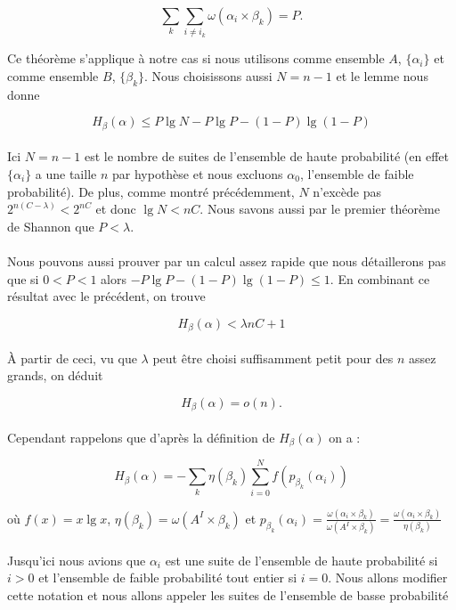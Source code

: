 	\[\sum_k\sum_{i\neq i_k}\omega(\alpha_i \times \beta_k) = P.\]	
	
	Ce théorème s'applique à notre cas si nous utilisons comme ensemble $A$,
	$\{\alpha_i\}$ et comme ensemble $B$, $\{\beta_k\}$. Nous choisissons
	aussi $N = n-1$ et le lemme nous donne
	
	\[H_\beta(\alpha)\le P\lg N - P\lg P - (1-P)\lg(1-P)\]
	
	\paragraph{}
	Ici $N = n-1$ est le nombre de suites de l'ensemble de haute probabilité 
	(en effet $\{\alpha_i\}$ a une taille $n$ par hypothèse et nous excluons
	$\alpha_0$, l'ensemble de faible probabilité). De plus, comme montré 
	précédemment, $N$ n'excède pas $2^{n(C-\lambda)}<2^{nC}$ et donc 
	$\lg N<nC$. Nous savons aussi par le premier théorème de Shannon 
	que $P<\lambda$.
	
	\paragraph{}
	Nous pouvons aussi prouver par un calcul assez rapide que nous détaillerons 
	pas que si $0<P<1$ alors $-P\lg P -(1-P)\lg(1-P)\le 1$. En combinant ce 
	résultat avec le précédent,	on trouve
	
	\[H_\beta(\alpha) < \lambda nC + 1\]
	
	\paragraph{}
	À partir de ceci, vu que $\lambda$ peut être choisi suffisamment petit pour
	 des $n$ assez grands, on déduit 
	
	\[H_\beta(\alpha)=o(n).\]
	
	\paragraph{}
	Cependant rappelons que d'après la définition de $H_\beta(\alpha)$ on a :
	
	\[
		H_\beta(\alpha) = 
		- \sum_k\eta(\beta_k)\sum_{i=0}^Nf(p_{\beta_k}(\alpha_i))
	\]
	
	où $f(x) = x \lg x$, $\eta(\beta_k) = \omega(A^I \times \beta_k)$ 
	et 
		$p_{\beta_k}(\alpha_i) = 
		\frac{\omega(\alpha_i \times \beta_k)}{\omega(A^I \times \beta_k)}=
		\frac{\omega(\alpha_i \times \beta_k)}{\eta(\beta_k)}$	
	
	\paragraph{}
	Jusqu'ici nous avions que $\alpha_i$ est une suite de l'ensemble de haute 
	probabilité si $i>0$ et l'ensemble de faible probabilité tout entier si 
	$i=0$. Nous allons modifier cette notation et nous allons appeler les 
	suites de l'ensemble de basse probabilité 
	
